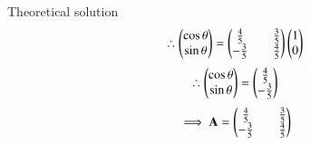 \documentclass{beamer}
\begin{document}
\begin{frame}{Theoretical solution}
\begin{align}
    \therefore \begin{pmatrix}\cos{\theta}\\\sin{\theta}\end{pmatrix}=\begin{pmatrix}\tfrac{4}{5}&&\tfrac{3}{5}\\-\tfrac{3}{5}&&\tfrac{4}{5}\end{pmatrix}\begin{pmatrix}1\\0\end{pmatrix}
\end{align}
\begin{align}
    \therefore \begin{pmatrix}\cos{\theta}\\\sin{\theta}\end{pmatrix}=\begin{pmatrix}\tfrac{4}{5}\\-\tfrac{3}{5}\end{pmatrix}
\end{align}
\begin{align}
    \implies \mathbf{A}=\begin{pmatrix}\tfrac{4}{5}&&\tfrac{3}{5}\\-\tfrac{3}{5}&&\tfrac{4}{5}\end{pmatrix}
\end{align}
\end{frame}
\end{document}
